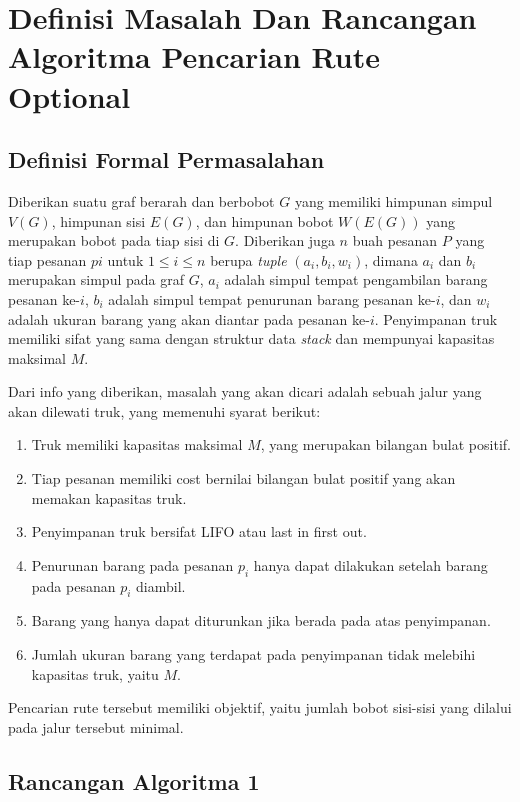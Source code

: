 \chapter{Definisi Masalah Dan Rancangan Algoritma Pencarian Rute Optional}

\section{Definisi Formal Permasalahan}

Diberikan suatu graf berarah dan berbobot $G$ yang memiliki himpunan simpul $V(G)$, himpunan sisi $E(G)$, dan himpunan bobot $W(E(G))$ yang merupakan 
bobot pada tiap sisi di $G$. Diberikan juga $n$ buah pesanan $P$ yang tiap pesanan $pi$ untuk $1 \leq i \leq n$ berupa \textit{tuple} $(a_{i}, b_{i}, w_{i})$, 
dimana $a_{i}$ dan $b_{i}$ merupakan simpul pada graf $G$, $a_{i}$ adalah simpul tempat pengambilan barang pesanan ke-$i$, $b_{i}$ adalah simpul tempat penurunan 
barang pesanan ke-$i$, dan $w_{i}$ adalah ukuran barang yang akan diantar pada pesanan ke-$i$. Penyimpanan truk memiliki sifat yang sama dengan struktur data \textit{stack} 
dan mempunyai kapasitas maksimal $M$.

Dari info yang diberikan, masalah yang akan dicari adalah sebuah jalur yang akan dilewati truk, yang memenuhi syarat berikut:
\begin{enumerate}
    \item Truk memiliki kapasitas maksimal $M$, yang merupakan bilangan bulat positif.
    \item Tiap pesanan memiliki cost bernilai bilangan bulat positif yang akan memakan kapasitas truk.
    \item Penyimpanan truk bersifat LIFO atau last in first out.
    \item Penurunan barang pada pesanan $p_{i}$ hanya dapat dilakukan setelah barang pada pesanan $p_{i}$ diambil.
    \item Barang yang hanya dapat diturunkan jika berada pada atas penyimpanan.
    \item Jumlah ukuran barang yang terdapat pada penyimpanan tidak melebihi kapasitas truk, yaitu $M$.
\end{enumerate}

Pencarian rute tersebut memiliki objektif, yaitu jumlah bobot sisi-sisi yang dilalui pada jalur tersebut minimal.

\section{Rancangan Algoritma 1}

